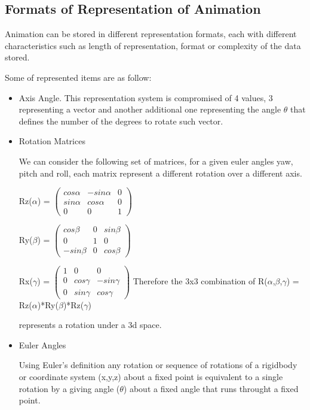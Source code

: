 \subsection{Formats of Representation of Animation} \label{subsec:AnimationRepresentationFormats}

Animation can be stored in different representation formats, each with different characteristics such as length of representation,  format or complexity of the data stored.

Some of represented items are as follow:

\begin{itemize} 
	\item  Axis Angle.
	This representation system is compromised of 4 values, 3 representing a vector and another additional one representing 
	the angle $\theta$ that defines the number of the degrees to rotate such vector.
	\item  Rotation Matrices
	
	We can consider the following set of matrices, for a given euler angles yaw, pitch and roll, each matrix
	represent a different rotation over a different axis.
	
	Rz($\alpha$) = 
	$\begin{pmatrix} 
	cos \alpha & -sin \alpha & 0 \\ 
	sin \alpha & cos \alpha & 0 \\ 
	0 & 0 & 1  
	\end{pmatrix} $
		
	Ry($\beta$) = 
	$\begin{pmatrix} 
	cos \beta & 0 & sin \beta \\ 
	0 & 1 & 0 \\ 
	-sin \beta & 0 & cos \beta  
	\end{pmatrix} $
	
	Rx($\gamma$) = 
	$\begin{pmatrix} 
	1 & 0 & 0 \\ 
	0 & cos \gamma & -sin \gamma \\ 
	0 & sin \gamma & cos \gamma  
	\end{pmatrix} $ 
	\bigbreak \bigbreak 
	Therefore the 3x3 combination of
	R($\alpha$,$\beta$,$\gamma$) = Rz($\alpha$)*Ry($\beta$)*Rz($\gamma$)
	
	represents a rotation under a 3d space.
	
	\item  Euler Angles
	
	Using Euler's definition any rotation or sequence of rotations of a rigidbody or coordinate system  (x,y,z) about a fixed point is equivalent to a single rotation by a giving angle ($\theta$) about a fixed angle that runs throught a fixed point.
	

\end{itemize}
